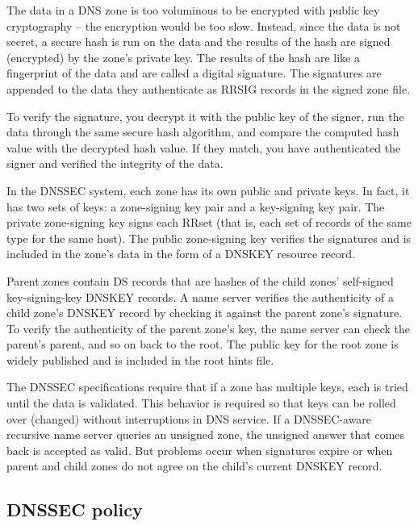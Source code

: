 The data in a DNS zone is too voluminous to be encrypted with public key
cryptography -- the encryption would be too slow. Instead, since the data
is not secret, a secure hash is run on the data and the results of the
hash are signed (encrypted) by the zone's private key. The results of
the hash are like a fingerprint of the data and are called a digital
signature. The signatures are appended to the data they authenticate as
RRSIG records in the signed zone file.

To verify the signature, you decrypt it with the public key of the
signer, run the data through the same secure hash algorithm, and compare
the computed hash value with the decrypted hash value. If they match,
you have authenticated the signer and verified the integrity of the
data.

In the DNSSEC system, each zone has its own public and private keys. In
fact, it has two sets of keys: a zone-signing key pair and a key-signing
key pair. The private zone-signing key signs each RRset (that is, each
set of records of the same type for the same host). The public
zone-signing key verifies the signatures and is included in the zone's
data in the form of a DNSKEY resource record.

Parent zones contain DS records that are hashes of the child zones'
self-signed key-signing-key DNSKEY records. A name server verifies the
authenticity of a child zone's DNSKEY record by checking it against the
parent zone's signature. To verify the authenticity of the parent zone's
key, the name server can check the parent's parent, and so on back to
the root. The public key for the root zone is widely published and is
included in the root hints file.

The DNSSEC specifications require that if a zone has multiple keys, each
is tried until the data is validated. This behavior is required so that
keys can be rolled over (changed) without interruptions in DNS service.
If a DNSSEC-aware recursive name server queries an unsigned zone, the
unsigned answer that comes back is accepted as valid. But problems occur
when signatures expire or when parent and child zones do not agree on
the child's current DNSKEY record.

\protect\hypertarget{part0024_split_060.html}{}{}

\hypertarget{part0024_split_060.htmlux5cux23_idContainer1069}{}
\hypertarget{part0024_split_060.htmlux5cux23calibre_pb_59}{%
\subsection[DNSSEC
policy]{\texorpdfstring{\protect\hypertarget{part0024_split_060.htmlux5cux23_idTextAnchor939}{}{}DNSSEC
policy}{DNSSEC policy}}\label{part0024_split_060.htmlux5cux23calibre_pb_59}}

